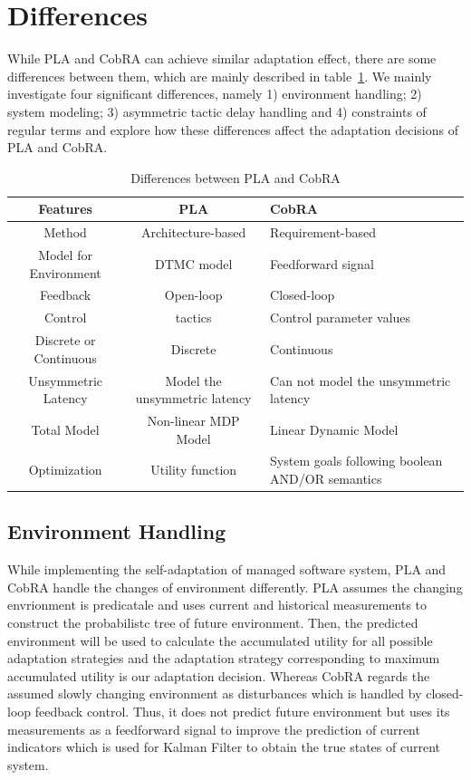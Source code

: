\documentclass[sigconf]{acmart}
\begin{document}
\section{Differences}
While PLA and CobRA can achieve similar adaptation effect, there are some differences between them, which are mainly described in table~\ref{tab:differences}. We mainly investigate four significant differences, namely 1) environment handling; 2) system modeling; 3) asymmetric tactic delay handling and 4) constraints of regular terms and explore how these differences affect the adaptation decisions of PLA and CobRA.

\begin{table}
	\caption{Differences between PLA and CobRA}
	\label{tab:differences}
	\begin{tabular}{ccl}
		\toprule
		Features&PLA&CobRA\\
		\midrule
		Method & Architecture-based& Requirement-based\\
		Model for Environment & DTMC model
		& Feedforward signal 
		\\
		Feedback & Open-loop
		& Closed-loop\\
		Control  & tactics& Control parameter values
		\\
		Discrete or Continuous&Discrete&Continuous\\
		Unsymmetric Latency&Model the unsymmetric latency&Can not model the unsymmetric latency
		\\
		Total Model&Non-linear MDP Model&Linear Dynamic Model\\
		Optimization&Utility function&System goals following boolean AND/OR semantics\\
		
		\bottomrule
	\end{tabular}
\end{table}

\subsection{Environment Handling}
While implementing the self-adaptation of managed software system, PLA and CobRA handle the changes of environment differently. PLA assumes the changing envrionment is predicatale and uses current and historical measurements to construct the probabilistc tree of future environment. Then, the predicted environment will be used to calculate the accumulated utility for all possible adaptation strategies and the adaptation strategy corresponding to maximum accumulated utility is our adaptation decision. Whereas CobRA regards the assumed slowly changing environment as disturbances which is handled by closed-loop feedback control. Thus, it does not predict future environment but uses its measurements as a feedforward signal to improve the prediction of current indicators which is used for Kalman Filter to obtain the true states of current system. 
\end{document}
